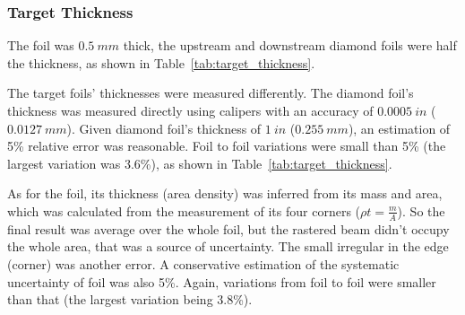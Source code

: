 \subsubsection{Target Thickness}
The \Pb foil was $0.5\ mm$ thick, the upstream and downstream diamond foils 
were half the \Pb thickness, as shown in Table~\ref{tab:target_thickness}.

The target foils' thicknesses were measured differently. The diamond foil's 
thickness was measured directly using calipers with an accuracy of $0.0005 \ in$ ($0.0127 \ mm$).
Given diamond foil's thickness of $1\ in$ ($0.255 \ mm$), an estimation of 5\% 
relative error was reasonable. Foil to foil variations were small than 5\% (the
largest variation was 3.6\%), as shown in Table~\ref{tab:target_thickness}.

As for the \Pb foil, its thickness (area density) was inferred from its mass 
and area, which was calculated from the measurement of its four corners ($\rho t = \frac{m}{A}$). 
So the final result was average over the whole foil, but the rastered beam 
didn't occupy the whole area, that was a source of uncertainty. The small irregular
in the edge (corner) was another error. A conservative estimation of the systematic
uncertainty of \Pb foil was also 5\%. Again, variations from foil to foil were 
smaller than that (the largest variation being 3.8\%).

